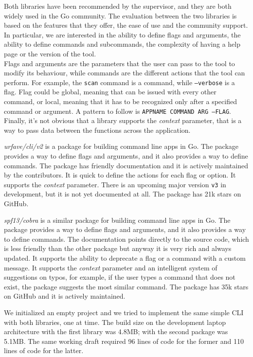 Both libraries have been recommended by the supervisor, and they are both widely used in the Go community. The evaluation between the two libraries is based on the features that they offer, the ease of use and the community support. In particular, we are interested in the ability to define flags and arguments, the ability to define commands and subcommands, the complexity of having a help page or the version of the tool.\\
Flags and arguments are the parameters that the user can pass to the tool to modify its behaviour, while commands are the different actions that the tool can perform. For example, the \texttt{scan} command is a command, while \texttt{--verbose} is a flag. Flag could be global, meaning that can be issued with every other command, or local, meaning that it has to be recognized only after a specified command or argument. A pattern to follow is \texttt{APPNAME COMMAND ARG --FLAG}. Finally, it's not obvious that a library supports the \textit{context} parameter, that is a way to pass data between the functions across the application.

\textit{urfave/cli/v2} is a package for building command line apps in Go. The package provides a way to define flags and arguments, and it also provides a way to define commands. The package has friendly documentation and it is actively maintained by the contributors. It is quick to define the actions for each flag or option. It supports the \textit{context} parameter. There is an upcoming major version \texttt{v3} in development, but it is not yet documented at all. The package has 21k stars on GitHub.

\textit{spf13/cobra} is a similar package for building command line apps in Go. The package provides a way to define flags and arguments, and it also provides a way to define commands. The documentation points directly to the source code, which is less friendly than the other package but anyway it is very rich and always updated. It supports the ability to deprecate a flag or a command with a custom message. It supports the \textit{context} parameter and an intelligent system of suggestions on typos, for example, if the user types a command that does not exist, the package suggests the most similar command. The package has 35k stars on GitHub and it is actively maintained.

We initialized an empty project and we tried to implement the same simple CLI with both libraries, one at time. The build size on the development laptop architecture with the first library was 4.8MB; with the second package was 5.1MB. The same working draft required 96 lines of code for the former and 110 lines of code for the latter.

